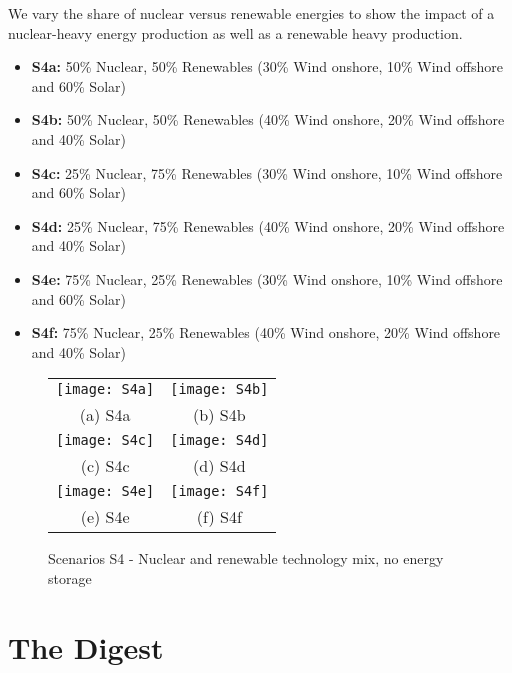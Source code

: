 We vary the share of nuclear versus renewable energies to show the impact of a nuclear-heavy energy production as well as a renewable heavy production.


\begin{kaobox}[frametitle=S4 scenarios]
\begin{itemize}
	\item \textbf{S4a:} 50\% Nuclear, 50\% Renewables (30\% Wind onshore, 10\% Wind offshore and 60\% Solar)
	\item \textbf{S4b:} 50\% Nuclear, 50\% Renewables (40\% Wind onshore, 20\% Wind offshore and 40\% Solar)
	\item \textbf{S4c:} 25\% Nuclear, 75\% Renewables (30\% Wind onshore, 10\% Wind offshore and 60\% Solar)
	\item \textbf{S4d:} 25\% Nuclear, 75\% Renewables (40\% Wind onshore, 20\% Wind offshore and 40\% Solar)
	\item \textbf{S4e:} 75\% Nuclear, 25\% Renewables (30\% Wind onshore, 10\% Wind offshore and 60\% Solar)
	\item \textbf{S4f:} 75\% Nuclear, 25\% Renewables (40\% Wind onshore, 20\% Wind offshore and 40\% Solar)
\end{itemize}
\end{kaobox}



\begin{figure*}
\begin{tabular}{cc}
  \texttt{[image: S4a]} &   \texttt{[image: S4b]} \\
(a) S4a & (b) S4b \\[6pt]
 \texttt{[image: S4c]} &   \texttt{[image: S4d]} \\
(c) S4c & (d) S4d \\[6pt]
 \texttt{[image: S4e]} &   \texttt{[image: S4f]} \\
(e) S4e & (f) S4f \\[6pt]
\end{tabular}
\caption{Scenarios S4 - Nuclear and renewable technology mix, no energy storage}
\end{figure*}




\section{The Digest}


